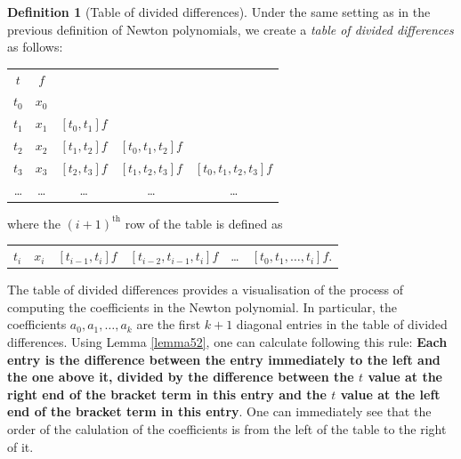 \documentclass[a4paper,11pt,titlepage]{article}
\theoremstyle{definition}
\newtheorem{definition}{Definition}[section]
\theoremstyle{plain}
\theoremstyle{remark}
\begin{document}
\begin{definition}
    [Table of divided differences] Under the same setting as in the previous definition of Newton polynomials, we create a \textit{table of divided differences} as follows:

\begin{center}
\begin{tabular}{ c c c c c }
 $t$ & $f$ & & & \\ 
 $t_0$ & $x_0$ & & & \\  
 $t_1$ & $x_1$ & $[t_0,t_1]f$ & & \\
 $t_2$ & $x_2$ & $[t_1,t_2]f$ & $[t_0,t_1,t_2]f$ & \\
 $t_3$ & $x_3$ & $[t_2,t_3]f$ & $[t_1,t_2,t_3]f$ &  $[t_0,t_1,t_2,t_3]f$ \\
 \dots & \dots & \dots & \dots & \dots
\end{tabular}
\end{center}

where the $(i+1)^{\mathrm{th}}$ row of the table is defined as 

\begin{center}
\begin{tabular}{ c c c c c c }
$t_i$ & $x_i$ & $[t_{i-1},t_i]f$ & $[t_{i-2},t_{i-1},t_i]f$ & \dots & $[t_0,t_1,\dots,t_i]f.$
\end{tabular}
\end{center}
\end{definition}

The table of divided differences provides a visualisation of the process of computing the coefficients in the Newton polynomial. In particular, the coefficients $a_0,a_1,\dots,a_k$ are the first $k+1$ diagonal entries in the table of divided differences. Using Lemma \ref{lemma52}, one can calculate following this rule: \textbf{Each entry is the difference between the entry immediately to the left and the one above it, divided by the difference between the $t$ value at the right end of the bracket term in this entry and the $t$ value at the left end of the bracket term in this entry}. One can immediately see that the order of the calulation of the coefficients is from the left of the table to the right of it.
\end{document}
